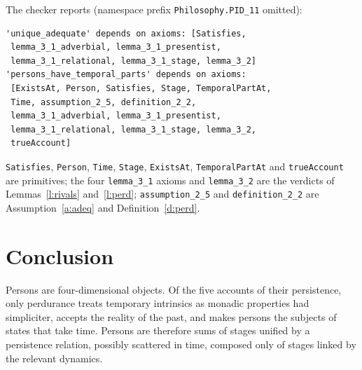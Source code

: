 \documentclass{situationist-preprint}
\begin{document}
The checker reports (namespace prefix \texttt{Philosophy.PID\_11} omitted):

\begin{lstlisting}
'unique_adequate' depends on axioms: [Satisfies,
 lemma_3_1_adverbial, lemma_3_1_presentist,
 lemma_3_1_relational, lemma_3_1_stage, lemma_3_2]
'persons_have_temporal_parts' depends on axioms:
 [ExistsAt, Person, Satisfies, Stage, TemporalPartAt,
 Time, assumption_2_5, definition_2_2,
 lemma_3_1_adverbial, lemma_3_1_presentist,
 lemma_3_1_relational, lemma_3_1_stage, lemma_3_2,
 trueAccount]
\end{lstlisting}

\texttt{Satisfies}, \texttt{Person}, \texttt{Time}, \texttt{Stage}, \texttt{ExistsAt}, \texttt{TemporalPartAt} and \texttt{trueAccount} are primitives; the four \texttt{lemma\_3\_1} axioms and \texttt{lemma\_3\_2} are the verdicts of Lemmas~\ref{l:rivals} and~\ref{l:perd}; \texttt{assumption\_2\_5} and \texttt{definition\_2\_2} are Assumption~\ref{a:adeq} and Definition~\ref{d:perd}.

\section{Conclusion}

Persons are four-dimensional objects. Of the five accounts of their persistence, only perdurance treats temporary intrinsics as monadic properties had simpliciter, accepts the reality of the past, and makes persons the subjects of states that take time. Persons are therefore sums of stages unified by a persistence relation, possibly scattered in time, composed only of stages linked by the relevant dynamics.
\end{document}
